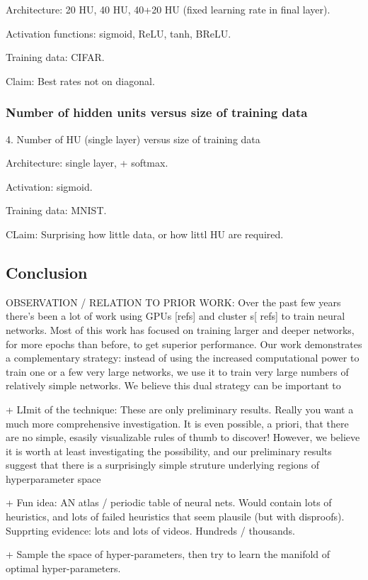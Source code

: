 \documentclass[10pt]{article}
\begin{document}
Architecture: 20 HU, 40 HU, 40+20 HU (fixed learning rate in final
layer).

Activation functions: sigmoid, ReLU, tanh, BReLU.

Training data: CIFAR.

Claim: Best rates not on diagonal.

\subsubsection*{Number of hidden units versus size of training data}

4. Number of HU (single layer) versus size of training data

Architecture: single layer, + softmax.

Activation: sigmoid.

Training data: MNIST.


CLaim: Surprising how little data, or how littl HU are required.

\subsection*{Conclusion}

OBSERVATION / RELATION TO PRIOR WORK: Over the past few years there's
been a lot of work using GPUs [refs] and cluster s[ refs] to train
neural networks.  Most of this work has focused on training larger and
deeper networks, for more epochs than before, to get superior
performance.  Our work demonstrates a complementary strategy: instead
of using the increased computational power to train one or a few very
large networks, we use it to train very large numbers of relatively
simple networks.  We believe this dual strategy can be important to

+ LImit of the technique: These are only preliminary results.  Really
you want a much more comprehensive investigation.  It is even
possible, a priori, that there are no simple, esasily visualizable
rules of thumb to discover!  However, we believe it is worth at least
investigating the possibility, and our preliminary results suggest
that there is a surprisingly simple struture underlying regions of
hyperparameter space

+ Fun idea: AN atlas / periodic table of neural nets.  Would contain
lots of heuristics, and lots of failed heuristics that seem plausile
(but with disproofs).  Supprting evidence: lots and lots of videos.
Hundreds / thousands.

+ Sample the space of hyper-parameters, then try to learn the manifold
of optimal hyper-parameters.
\end{document}
